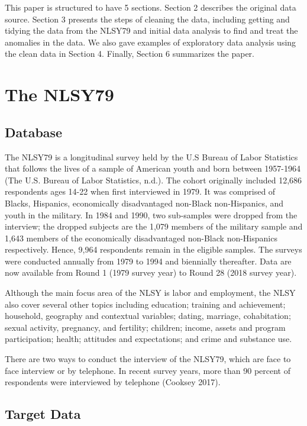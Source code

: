 \documentclass{article}
\begin{document}
This paper is structured to have 5 sections. Section 2 describes the original data source. Section 3 presents the steps of cleaning the data, including getting and tidying the data from the NLSY79 and initial data analysis to find and treat the anomalies in the data. We also gave examples of exploratory data analysis using the clean data in Section 4. Finally, Section 6 summarizes the paper.

\hypertarget{the-nlsy79}{%
\section{The NLSY79}\label{the-nlsy79}}

\hypertarget{database}{%
\subsection{Database}\label{database}}

The NLSY79 is a longitudinal survey held by the U.S Bureau of Labor Statistics that follows the lives of a sample of American youth and born between 1957-1964 (The U.S. Bureau of Labor Statistics, n.d.). The cohort originally included 12,686 respondents ages 14-22 when first interviewed in 1979. It was comprised of Blacks, Hispanics, economically disadvantaged non-Black non-Hispanics, and youth in the military. In 1984 and 1990, two sub-samples were dropped from the interview; the dropped subjects are the 1,079 members of the military sample and 1,643 members of the economically disadvantaged non-Black non-Hispanics respectively. Hence, 9,964 respondents remain in the eligible samples. The surveys were conducted annually from 1979 to 1994 and biennially thereafter. Data are now available from Round 1 (1979 survey year) to Round 28 (2018 survey year).

Although the main focus area of the NLSY is labor and employment, the NLSY also cover several other topics including education; training and achievement; household, geography and contextual variables; dating, marriage, cohabitation; sexual activity, pregnancy, and fertility; children; income, assets and program participation; health; attitudes and expectations; and crime and substance use.

There are two ways to conduct the interview of the NLSY79, which are face to face interview or by telephone. In recent survey years, more than 90 percent of respondents were interviewed by telephone (Cooksey 2017).

\hypertarget{target-data}{%
\subsection{Target Data}\label{target-data}}
\end{document}
